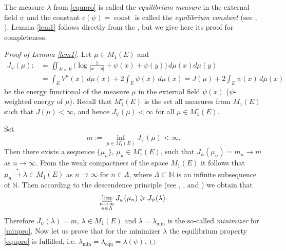 \documentclass[11pt, a4paper, twoside]{article}
\let\geq\geqslant
\def\NN{\mathbb N}
\def\const{\operatorname{const}}
\def\equ{\operatorname{equ}}
\theoremstyle{plain}
\theoremstyle{definition}
\begin{document}
The measure $\lambda$ from \eqref{equpro} is called the {\it equilibrium measure} in the external field $\psi$ and the constant $c(\psi)=\const$ is called the {\it equilibrium constant} (see  \cite{GoRa87}, \cite{SaTo97}). Lemma \ref{lem1} follows directly from the \cite[\S 3, Lemma 6]{GoRa87}, \cite{NiSo88} but we give here its proof for completeness.

\begin{proof}[Proof of Lemma \ref{lem1}]
Let $\mu\in M_1(E)$ and
\begin{align}
J_\psi(\mu):&=\iint_{E\times E}\biggl(
\log\frac1{|x-y|}+\psi(x)+\psi(y)\biggr)\,d\mu(x)d\mu(y)\nonumber\\
&=\int_E V^\mu(x)\,d\mu(x)+2\int_E \psi(x)\,d\mu(x)
=J(\mu)+2\int_E \psi(x)\,d\mu(x)
\label{enefil}
\end{align}
be the energy functional of the measure $\mu$ in the external field $\psi(x)$ ($\psi$-weighted energy of $\mu$). Recall that $M^\circ_1(E)$ is the set all measures from $M_1(E)$ such that $J(\mu)<\infty$, and hence $J_\psi(\mu)<\infty$ for  all $\mu\in M_1^\circ(E)$.

Set
\begin{equation}
m:=\inf_{\mu\in M^\circ_1(E)}J_\psi(\mu)<\infty.
\label{minpro}
\end{equation}
Then there exists a sequence $\{\mu_n\}$, $\mu_n\in M^\circ_1(E)$, such that $J_\psi(\mu_n)=m_n\to m$ as $n\to\infty$. From the weak compactness of the space $M_1(E)$ it follows that $\mu_n\overset{*}\rightarrow\lambda\in M_1(E)$ as $n\to\infty$ for $n\in\Lambda$,
where $\Lambda\subset\NN$ is an infinite subsequence of $\NN$. 
Then according to the descendence principle (see \cite[Chapter I, \S 3, Theorem 1.3]{Lan66}, \cite{SaTo97}, \cite{Chi18} and \cite{Chi20}) we obtain that
$$
\varliminf_{\substack{n\to\infty\\n\in\Lambda}}
J_\psi(\mu_n)\geq J_\psi(\lambda).
$$
Therefore $J_\psi(\lambda)=m$, $\lambda\in M_1^\circ(E)$ and $\lambda=\lambda_{\min}$ is the so-called {\it minimizer} for \eqref{minpro}. Now let us prove that for the minimizer $\lambda$ the equilibrium property \eqref{equpro} is fulfilled, i.e. $\lambda_{\min}=\lambda_{\equ}=\lambda(\psi)$. 


\end{proof}
\end{document}
